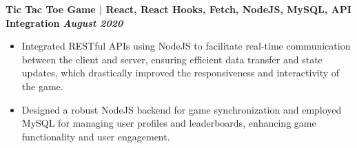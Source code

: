 \documentclass{article}
\begin{document}
\vspace{1mm} 
\noindent \textbf{Tic Tac Toe Game $\mid$ React, React Hooks, Fetch, NodeJS, MySQL, API Integration} \textit{\hfill \textbf{August 2020}} 
\begin{itemize}[noitemsep,nolistsep,leftmargin=*]
  \item {\small Integrated RESTful APIs using NodeJS to facilitate real-time communication between the client and server, ensuring efficient data transfer and state updates, which drastically improved the responsiveness and interactivity of the game.}
  \item {\small Designed a robust NodeJS backend for game synchronization and employed MySQL for managing user profiles and leaderboards, enhancing game functionality and user engagement.}
\end{itemize}



\end{document}
